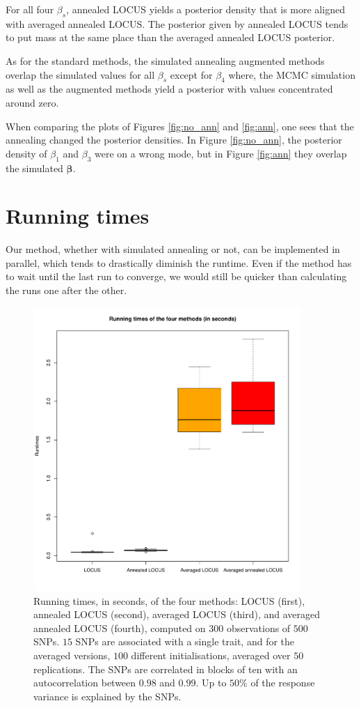 \documentclass[a4paper, 11pt]{report}
\numberwithin{equation}{chapter}
\begin{document}
For all four $\beta_s$, annealed LOCUS yields a posterior density that is more aligned with averaged annealed LOCUS. The posterior given by annealed LOCUS tends to put mass at the same place than the averaged annealed LOCUS posterior.

As for the standard methods, the simulated annealing augmented methods overlap the simulated values for all $\beta_s$ except for $\beta_4$ where, the MCMC simulation as well as the augmented methods yield a posterior with values concentrated around zero.

When comparing the plots of Figures \ref{fig:no_ann} and \ref{fig:ann}, one sees that the annealing changed the posterior densities. In Figure \ref{fig:no_ann}, the posterior density of $\beta_1$ and $\beta_3$ were on a wrong mode, but in Figure \ref{fig:ann} they overlap the simulated $\boldsymbol{\beta}$. 

\section{Running times}

Our method, whether with simulated annealing or not, can be implemented in parallel, which tends to drastically diminish the runtime. Even if the method has to wait until the last run to converge, we would still be quicker than calculating the runs one after the other.

\begin{figure}[h]
\centering
\includegraphics[width=4in,bb= 0 0 700 700]{images/runtimes.pdf}
\caption{\label{fig:runtime} Running times, in seconds, of the four methods: LOCUS (first), annealed LOCUS (second), averaged LOCUS (third), and averaged annealed LOCUS (fourth), computed on $300$ observations of $500$ SNPs. $15$ SNPs are associated with a single trait, and for the averaged versions, $100$ different initialisations, averaged over $50$ replications. The SNPs are correlated in blocks of ten with an autocorrelation between $0.98$ and $0.99$. Up to $50\%$ of the response variance is explained by the SNPs.}
\end{figure}
\end{document}
